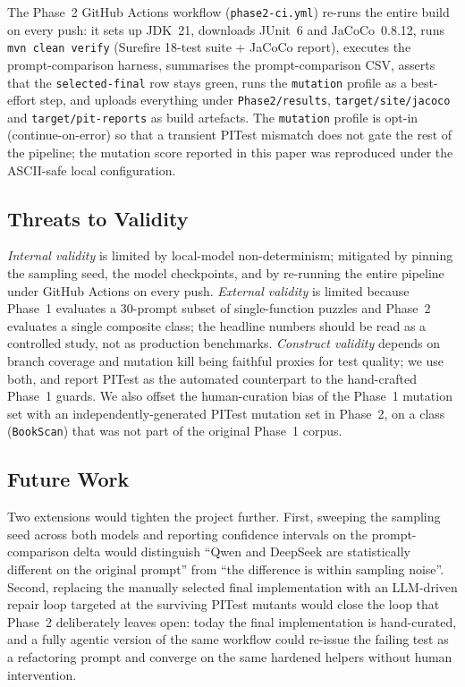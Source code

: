\documentclass[journal]{IEEEtran}
\begin{document}
The Phase~2 GitHub Actions workflow (\texttt{phase2-ci.yml}) re-runs the
entire build on every push: it sets up JDK~21, downloads JUnit~6 and
JaCoCo~0.8.12, runs \texttt{mvn clean verify} (Surefire 18-test suite +
JaCoCo report), executes the prompt-comparison harness, summarises the
prompt-comparison CSV, asserts that the \texttt{selected-final} row stays
green, runs the \texttt{mutation} profile as a best-effort step, and
uploads everything under \texttt{Phase2/results}, \texttt{target/site/jacoco}
and \texttt{target/pit-reports} as build artefacts. The \texttt{mutation}
profile is opt-in (continue-on-error) so that a transient PITest
mismatch does not gate the rest of the pipeline; the mutation score
reported in this paper was reproduced under the ASCII-safe local
configuration.

\subsection{Threats to Validity}
\emph{Internal validity} is limited by local-model non-determinism;
mitigated by pinning the sampling seed, the model checkpoints, and by
re-running the entire pipeline under GitHub Actions on every push.
\emph{External validity} is limited because Phase~1 evaluates a
30-prompt subset of single-function puzzles and Phase~2 evaluates a
single composite class; the headline numbers should be read as a
controlled study, not as production benchmarks. \emph{Construct
validity} depends on branch coverage and mutation kill being faithful
proxies for test quality; we use both, and report PITest as the
automated counterpart to the hand-crafted Phase~1 guards. We also offset
the human-curation bias of the Phase~1 mutation set with an
independently-generated PITest mutation set in Phase~2, on a class
(\texttt{BookScan}) that was not part of the original Phase~1 corpus.

\subsection{Future Work}
Two extensions would tighten the project further. First, sweeping the
sampling seed across both models and reporting confidence intervals on
the prompt-comparison delta would distinguish ``Qwen and DeepSeek are
statistically different on the original prompt'' from ``the difference
is within sampling noise''. Second, replacing the manually selected
final implementation with an LLM-driven repair loop targeted at the
surviving PITest mutants would close the loop that Phase~2 deliberately
leaves open: today the final implementation is hand-curated, and a
fully agentic version of the same workflow could re-issue the failing
test as a refactoring prompt and converge on the same hardened helpers
without human intervention.
\end{document}
